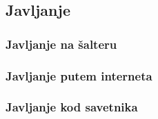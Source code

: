 \subsection{Javljanje}

\subsubsection{Javljanje na \v salteru}

\subsubsection{Javljanje putem interneta}

\subsubsection{Javljanje kod savetnika}